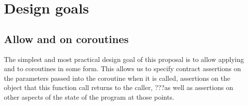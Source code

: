 
\section{Design goals}

\subsection{Allow  and  on coroutines}

The simplest and most practical design goal of this proposal is to allow applying  and  to coroutines in some form. This allows us to specify contract assertions on the parameters passed into the coroutine when it is called, assertions on the object that this function call returns to the caller, ???as well as assertions on other aspects of the state of the program at those points.

